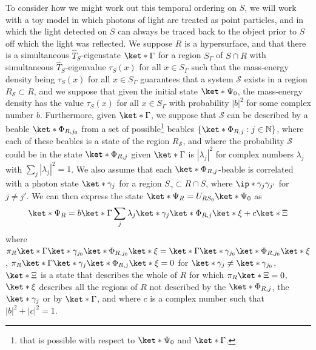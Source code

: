 \documentclass[12pt]{report}
\begin{document}
To consider how we might work out this temporal ordering on $S$, we will work with a toy model in which photons of light are treated as point particles, and in which the light detected on $S$ can always be traced back to the object prior to $S$ off which the light was reflected. We suppose $R$ is a hypersurface, and that there is a simultaneous $\hat{T}_S$-eigenstate $\ket*{\Gamma}$ for a region $S_{\Gamma}$ of $S\cap R$ with simultaneous $\hat{T}_S$-eigenvalue $\tau_S(x)$ for all $x\in S_{\Gamma}$ such that the mass-energy density being $\tau_S(x)$ for all $x\in S_\Gamma$ guarantees that a system $\mathcal{S}$ exists in a region $R_{\mathcal{S}}\subset R$, and we suppose that given the initial state $\ket*{\Psi_0}$, the mass-energy density has the value $\tau_S(x)$ for all $x\in S_\Gamma$ with probability $|b|^2$ for some complex number $b$. Furthermore, given $\ket*{\Gamma}$, we suppose that  $\mathcal{S}$ can be described by a beable $\ket*{\Phi_{R, j_0}}$ from a set of possible\footnote{that is possible with respect to $\ket*{\Psi_0}$ and $\ket*{\Gamma}$.} beables $\{ \ket*{\Phi_{R, j}}: j\in \mathbb{N}\}$, where each of these beables is a state of the region $R_{\mathcal{S}}$, and where the probability $\mathcal{S}$ could be in the state $\ket*{\Phi_{R, j}}$ given $\ket*{\Gamma}$ is $|\lambda_j|^2$ for complex numbers $\lambda_j$ with $\sum_j|\lambda_j|^2=1$. We also assume that each $\ket*{\Phi_{R, j}}$-beable is correlated with a photon state $\ket*{\gamma_{j}}$ for a region $S_{\gamma}\subset R\cap S$, where $\ip*{\gamma_{j}}{\gamma_{j'}}$ for $j\neq j'$. We can then express the state $\ket*{\Psi_R}=U_{RS_0}\ket*{\Psi_0}$ as 
\begin{equation}
\ket*{\Psi_R}=b\ket*{\Gamma}\sum_j \lambda_j \ket*{\gamma_{j}}\ket*{\Phi_{R, j}}\ket*{\xi}+c\ket*{\Xi}
\end{equation}
where $\pi_R\ket*{\Gamma}\ket*{\gamma_{j_0}}\ket*{\Phi_{R,j_0}}\ket*{\xi}=\ket*{\Gamma}\ket*{\gamma_{j_0}}\ket*{\Phi_{R,j_0}}\ket*{\xi}$,  
$\pi_R\ket*{\Gamma}\ket*{\gamma_{j}}\ket*{\Phi_{R,j}}\ket*{\xi}=0$
for $\ket*{\gamma_{j}}\neq \ket*{\gamma_{j_0}}$, 
$\ket*{\Xi}$ is  a state that describes the whole of $R$ for which $\pi_R\ket*{\Xi}=0$, $\ket*{\xi}$ describes all the regions of $R$ not described by the $\ket*{\Phi_{R,j}}$, the $\ket*{\gamma_{j}}$ or by $\ket*{\Gamma}$, and where $c$ is a complex number such that $|b|^2+|c|^2=1$.
\end{document}
